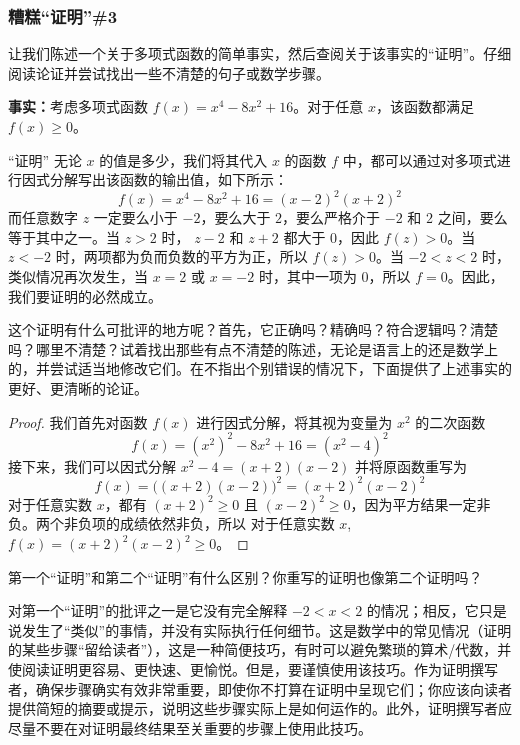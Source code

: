 \subsubsection*{糟糕``证明''\#3}

让我们陈述一个关于多项式函数的简单事实，然后查阅关于该事实的``证明''。仔细阅读论证并尝试找出一些不清楚的句子或数学步骤。

\textbf{事实：}考虑多项式函数 $f(x) = x^4-8x^2+16$。对于任意 $x$，该函数都满足 $f(x) \ge 0$。

\begin{proofs}{``证明''}
    无论 $x$ 的值是多少，我们将其代入 $x$ 的函数 $f$ 中，都可以通过对多项式进行因式分解写出该函数的输出值，如下所示：
    \[f(x) = x^4-8x^2+16 = (x-2)^2(x+2)^2\]
    而任意数字 $z$ 一定要么小于 $-2$，要么大于 $2$，要么严格介于 $-2$ 和 $2$ 之间，要么等于其中之一。当 $z > 2$ 时， $z - 2$ 和 $z + 2$ 都大于 $0$，因此 $f(z) > 0$。当 $z < -2$ 时，两项都为负而负数的平方为正，所以 $f(z) > 0$。当 $-2 < z < 2$ 时，类似情况再次发生，当 $x = 2$ 或 $x = -2$ 时，其中一项为 $0$，所以 $f = 0$。因此，我们要证明的必然成立。
\end{proofs}

这个证明有什么可批评的地方呢？首先，它正确吗？精确吗？符合逻辑吗？清楚吗？哪里不清楚？试着找出那些有点不清楚的陈述，无论是语言上的还是数学上的，并尝试适当地修改它们。在不指出个别错误的情况下，下面提供了上述事实的更好、更清晰的论证。

\begin{proof}
    我们首先对函数 $f(x)$ 进行因式分解，将其视为变量为 $x^2$ 的二次函数
    \[f(x) = (x^2)^2-8x^2+16 = (x^2-4)^2\]
    接下来，我们可以因式分解 $x^2-4=(x+2)(x-2)$ 并将原函数重写为
    \[f(x) = \big((x+2)(x-2)\big)^2 = (x+2)^2(x-2)^2\]
    对于任意实数 $x$，都有 $(x+2)^2 \ge 0$ 且 $(x-2)^2 \ge 0$，因为平方结果一定非负。两个非负项的成绩依然非负，所以 对于任意实数 $x$, $f(x) = (x+2)^2(x-2)^2 \ge 0$。
\end{proof}

第一个``证明''和第二个``证明''有什么区别？你重写的证明也像第二个证明吗？

对第一个``证明''的批评之一是它没有完全解释 $-2 < x < 2$ 的情况；相反，它只是说发生了``类似''的事情，并没有实际执行任何细节。这是数学中的常见情况（证明的某些步骤``留给读者''），这是一种简便技巧，有时可以避免繁琐的算术/代数，并使阅读证明更容易、更快速、更愉悦。但是，要谨慎使用该技巧。作为证明撰写者，确保步骤确实有效非常重要，即使你不打算在证明中呈现它们；你应该向读者提供简短的摘要或提示，说明这些步骤实际上是如何运作的。此外，证明撰写者应尽量不要在对证明最终结果至关重要的步骤上使用此技巧。

